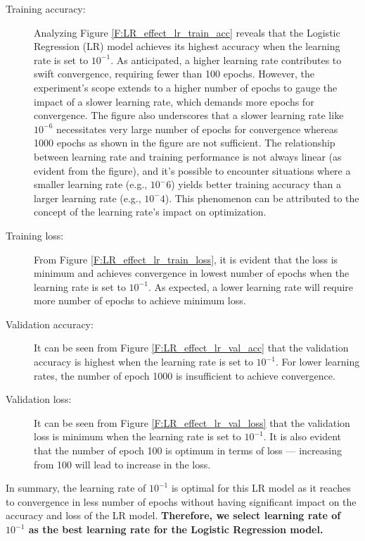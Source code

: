 \documentclass[12pt, a4paper, twoside]{article}
\begin{document}
\begin{description}
\item[Training accuracy:] Analyzing Figure \ref{F:LR_effect_lr_train_acc} reveals that the Logistic Regression (LR) model achieves its highest accuracy when the learning rate is set to $10^{-1}$. As anticipated, a higher learning rate contributes to swift convergence, requiring fewer than 100 epochs. However, the experiment's scope extends to a higher number of epochs to gauge the impact of a slower learning rate, which demands more epochs for convergence. The figure also underscores that a slower learning rate like $10^{-6}$ necessitates very large number of epochs for convergence whereas 1000 epochs as shown in the figure are not sufficient.  The relationship between learning rate and training performance is not always linear (as evident from the figure), and it's possible to encounter situations where a smaller learning rate (e.g., $10^-6$) yields better training accuracy than a larger learning rate (e.g., $10^-4$). This phenomenon can be attributed to the concept of the learning rate's impact on optimization.
\item[Training loss:] From Figure \ref{F:LR_effect_lr_train_loss}, it is evident that the loss is minimum and achieves convergence in lowest number of epochs when the learning rate is set to $10^{-1}$. As expected, a lower learning rate will require more number of epochs to achieve minimum loss.
\item[Validation accuracy:] It can be seen from Figure \ref{F:LR_effect_lr_val_acc} that the validation accuracy is highest when the learning rate is set to $10^{-1}$.  For lower learning rates, the number of epoch 1000 is insufficient to achieve convergence.
\item[Validation loss:] It can be seen from Figure \ref{F:LR_effect_lr_val_loss} that the validation loss is minimum when the learning rate is set to $10^{-1}$. It is also evident that the number of epoch 100 is optimum in terms of loss --- increasing from 100 will lead to increase in the loss.
\end{description}
\par
In summary, the learning rate of $10^{-1}$ is optimal for this LR model as it reaches to convergence in less number of epochs without having significant impact on the accuracy and loss of the LR model. \textbf{Therefore, we select learning rate of $10^{-1}$ as the best learning rate for the Logistic Regression model.}
\end{document}
